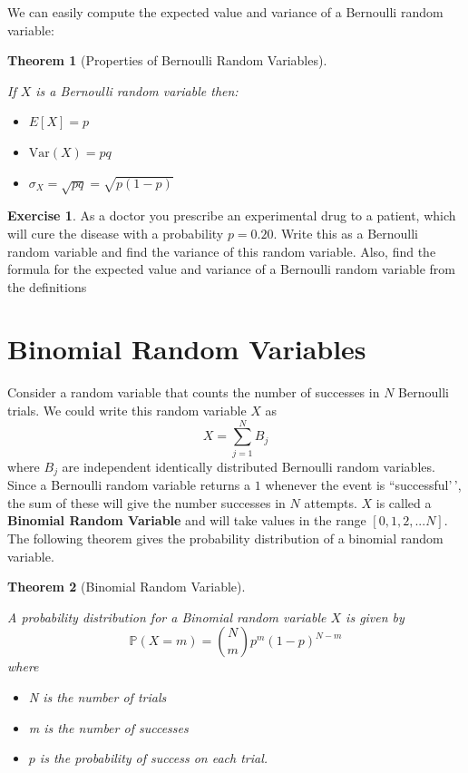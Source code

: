 \documentclass[
]{book}
\providecommand{\tightlist}{%
  \setlength{\itemsep}{0pt}\setlength{\parskip}{0pt}}
\newcommand{\var}{\mathrm{Var}}
\newcommand{\prob}[1]{{\mathbb{P}(#1)}}
\newtheorem{theorem}{Theorem}[chapter]
\theoremstyle{definition}
\theoremstyle{definition}
\theoremstyle{definition}
\newtheorem{exercise}{Exercise}[chapter]
\theoremstyle{definition}
\theoremstyle{remark}
\begin{document}
We can easily compute the expected value and variance of a Bernoulli random variable:

\begin{theorem}[Properties of Bernoulli Random Variables]
\protect\hypertarget{thm:unnamed-chunk-274}{}\label{thm:unnamed-chunk-274}

If \(X\) is a Bernoulli random variable then:

\begin{itemize}
\tightlist
\item
  \(E[X]=p\)
\item
  \(\var(X)=pq\)
\item
  \(\sigma_X=\sqrt{pq}=\sqrt{p(1-p)}\)
\end{itemize}

\end{theorem}

\begin{exercise}
\protect\hypertarget{exr:unnamed-chunk-275}{}\label{exr:unnamed-chunk-275}As a doctor you prescribe an experimental drug to a patient, which will cure the disease with a probability \(p=0.20\). Write this as a Bernoulli random variable and find the variance of this random variable. Also, find the formula for the expected value and variance of a Bernoulli random variable from the definitions
\end{exercise}

\hypertarget{binomial-random-variables}{%
\section{Binomial Random Variables}\label{binomial-random-variables}}

Consider a random variable that counts the number of successes in \(N\) Bernoulli trials. We could write this random variable \(X\) as \[X=\sum_{j=1}^N B_j\] where \(B_j\) are independent identically distributed Bernoulli random variables. Since a Bernoulli random variable returns a \(1\) whenever the event is ``successful'\,', the sum of these will give the number successes in \(N\) attempts. \(X\) is called a \textbf{Binomial Random Variable} and will take values in the range \([0,1,2,...N]\). The following theorem gives the probability distribution of a binomial random variable.

\begin{theorem}[Binomial Random Variable]
\protect\hypertarget{thm:unnamed-chunk-276}{}\label{thm:unnamed-chunk-276}

A probability distribution for a Binomial random variable \(X\) is given by \[ \prob{X=m}=\binom{N}{m} p^m (1-p)^{N-m}\]
where

\begin{itemize}
\tightlist
\item
  N is the number of trials
\item
  m is the number of successes
\item
  \(p\) is the probability of success on each trial.
\end{itemize}

\end{theorem}
\end{document}
